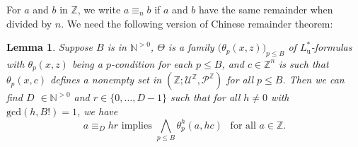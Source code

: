 \documentclass[letterpaper]{amsart}
\newcommand{\nn}{\mathbb{N}}
\newcommand{\zz}{\mathbb{Z}}
\newcommand{\sU}{\mathscr{U}}
\newcommand{\sP}{\mathscr{P}}
\newtheorem{lem}[thm]{Lemma}
\begin{document}
\medskip \noindent For $a$ and $b$ in $\zz$, we write $a\equiv_{n}b$ if $a$ and $b$ have the same remainder when divided by $n$. We need the following version of Chinese remainder theorem:
\begin{lem}\label{condense}
Suppose $B$ is in $\nn^{>0}$, $\Theta$ is a family $\big(\theta_p(x,z)\big)_{p \leq B}$ of $L^*_{\mathrm{u}}$-formulas with $\theta_p (x,z)$ being a $p$-condition for each $p\leq B$, and $c \in \zz^n$ is such that $\theta_p(x,c)$ defines a nonempty set in $(\zz; \sU^\zz, \sP^\zz)$ for all $p \leq B$. Then we can find $D$ $\in\nn^{>0}$ and $r \in  \{0, \ldots, D-1\} $ such that for all  $h\neq 0$ with  $\mathrm{gcd}(h,B!)=1$, we have 
$$a\equiv_{D} hr \text{ implies } \bigwedge_{p \leq B} \theta^h_p(a,hc)\ \  \text{ for all } a \in \zz.$$ 
\end{lem}
\begin{comment}
\begin{proof}
Let $\Theta$, $B$, and $c$ be as stated. Fix $h\neq 0$ such that $\mathrm{gcd}(h,B!)=1$ and let the family $\Theta^h=(\theta^h_p)$ be the $h$-conjugate  of $\Theta$ and $a$ an arbitrary element in $\zz$. Let a $p$-condition in $L^*_1(y) \ (y=(x,z))$ be of the form $s.y+t \in U^{\zz}_{p,l}$ for some $s$ in $\zz^{n+1}$, $t$ and $l$ in $\zz$. We observe that for all $b\in \zz^{n+1}$,
$$\neg (s.b + t \in U^{\zz}_{p,l}) \ \  \text{ if and only if } \ \ \bigvee_{i=1}^{p^l-1}(s.b + t + i \in U^{\zz}_{p,l}).$$
Then for any given $p$, $\theta^h_p(x,c)$ can be expressed as a disjunction of conjunctions of atomic formulas of the form $ k_1x+k_2 \in U^{\zz}_{p,l}$ for some $k_1$, $k_2$, and $l$ in $\zz$. Choose $l_p$ to be the maximum among all such $l$ occuring in the atomic formulas in $\theta^h_p(x,c)$.

Using that $\theta_p(x,c)$ and hence $\theta^h_p(x,hc)$ defines a nonempty set in $(\zz; \sU^\zz, \sP^\zz)$ for all primes, there is  $a_p\in \zz$ such that  $\theta^h_p(a_p,hc)$ holds. Now, observe that if $a\equiv_{p^{l_p}} a_p$ then $\theta(a,c)$ holds. 

So for each prime $p$ such that $p\leq B$, we get such an equivalence relation and using the chinese remainder theorem we may obtain $D$ independent of $h$ and $r_h$ as in the statement of the lemma.
\end{proof}
\end{comment}
\end{document}
